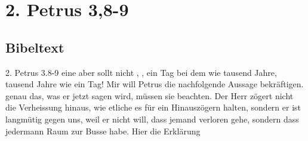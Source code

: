 \documentclass[11pt]{mybib}
\begin{document}
    \section{2. Petrus 3,8-9}
    \subsection{Bibeltext}
    \begin{auslegung}{2. Petrus 3.8-9}    
         eine aber sollt  nicht , ,
         ein Tag bei dem   wie tausend Jahre,
         tausend Jahre wie ein Tag!   
        \switchcolumn
        Mir  will Petrus die nachfolgende Aussage bekräftigen.  genau das, was er jetzt sagen wird, müssen sie beachten.
        \switchcolumn*
        Der Herr zögert nicht die Verheissung hinaus, wie etliche es für ein Hinauszögern halten, sondern er ist langmütig gegen uns, weil er nicht will, dass jemand verloren gehe, sondern dass jedermann Raum zur Busse habe.
        \switchcolumn
        Hier die Erklärung
    \end{auslegung}
    
\end{document}
